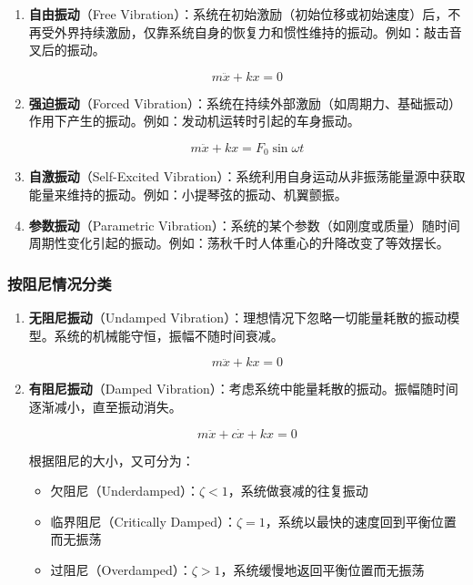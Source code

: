 \begin{enumerate}
    \item \textbf{自由振动}（Free Vibration）：系统在初始激励（初始位移或初始速度）后，不再受外界持续激励，仅靠系统自身的恢复力和惯性维持的振动。例如：敲击音叉后的振动。
    \begin{myformula}
        \[
        m\ddot{x} + kx = 0
        \]
    \end{myformula}
    
    \item \textbf{强迫振动}（Forced Vibration）：系统在持续外部激励（如周期力、基础振动）作用下产生的振动。例如：发动机运转时引起的车身振动。
    \begin{myformula}
        \[
        m\ddot{x} + kx = F_0\sin\omega t
        \]
    \end{myformula}
    
    \item \textbf{自激振动}（Self-Excited Vibration）：系统利用自身运动从非振荡能量源中获取能量来维持的振动。例如：小提琴弦的振动、机翼颤振。
    
    \item \textbf{参数振动}（Parametric Vibration）：系统的某个参数（如刚度或质量）随时间周期性变化引起的振动。例如：荡秋千时人体重心的升降改变了等效摆长。
\end{enumerate}

\subsubsection{按阻尼情况分类}

\begin{enumerate}
    \item \textbf{无阻尼振动}（Undamped Vibration）：理想情况下忽略一切能量耗散的振动模型。系统的机械能守恒，振幅不随时间衰减。
    \begin{myformula}
        \[
        m\ddot{x} + kx = 0
        \]
    \end{myformula}
    
    \item \textbf{有阻尼振动}（Damped Vibration）：考虑系统中能量耗散的振动。振幅随时间逐渐减小，直至振动消失。
    \begin{myformula}
        \[
        m\ddot{x} + c\dot{x} + kx = 0
        \]
    \end{myformula}
    
    根据阻尼的大小，又可分为：
    \begin{itemize}
        \item 欠阻尼（Underdamped）：$\zeta < 1$，系统做衰减的往复振动
        \item 临界阻尼（Critically Damped）：$\zeta = 1$，系统以最快的速度回到平衡位置而无振荡
        \item 过阻尼（Overdamped）：$\zeta > 1$，系统缓慢地返回平衡位置而无振荡
    \end{itemize}
\end{enumerate}

